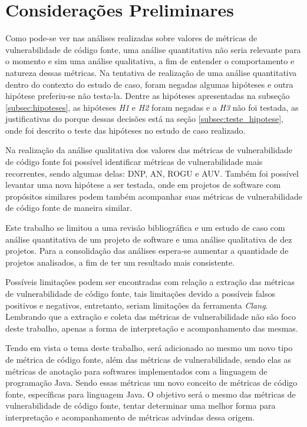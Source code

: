\chapter{Considerações Preliminares}

Como pode-se ver nas análises realizadas sobre valores de métricas de
vulnerabilidade de código fonte, uma análise quantitativa não seria relevante
para o momento e sim uma análise qualitativa, a fim de entender o comportamento
e natureza dessas métricas. Na tentativa de realização de uma análise
quantitativa dentro do contexto do estudo de caso, foram negadas algumas
hipóteses e outra hipótese preferiu-se não testa-la. Dentre as hipóteses
apresentadas na subseção \ref{subsec:hipoteses}, as hipóteses \emph{H1} e \emph{H2}
foram negadas e a \emph{H3} não foi testada, as justificativas do porque dessas
decisões está na seção \ref{subsec:teste_hipotese}, onde foi descrito o teste
das hipóteses no estudo de caso realizado.

Na realização da análise qualitativa dos valores das métricas de vulnerabilidade
de código fonte foi possível identificar métricas de vulnerabilidade mais
recorrentes, sendo algumas delas: DNP, AN, ROGU e AUV. Também foi possível
levantar uma nova hipótese a ser testada, onde em projetos de software com
propósitos similares podem também acompanhar suas métricas de vulnerabilidade de
código fonte de maneira similar.

Este trabalho se limitou a uma revisão bibliográfica e um estudo de caso com análise 
quantitativa de um projeto de software e uma análise qualitativa de dez
projetos. Para a consolidação das análises espera-se aumentar a quantidade de
projetos analisados, a fim de ter um resultado mais consistente.

Possíveis limitações podem ser encontradas com relação a extração das métricas
de vulnerabilidade de código fonte, tais limitações devido a possíveis falsos
positivos e negativos, entretanto, seriam limitações da ferramenta \emph{Clang}.
Lembrando que a extração e coleta das métricas de vulnerabilidade não são foco
deste trabalho, apenas a forma de interpretação e acompanhamento das mesmas.

Tendo em vista o tema deste trabalho, será adicionado ao mesmo um novo tipo de
métrica de código fonte, além das métricas de vulnerabilidade, sendo elas as
métricas de anotação para softwares implementados com a linguagem de programação
Java. Sendo essas métricas um novo conceito de métricas de código fonte,
específicas para linguagem Java. O objetivo será o mesmo das métricas de
vulnerabilidade de código fonte, tentar determinar uma melhor forma para
interpretação e acompanhamento de métricas advindas dessa origem.


